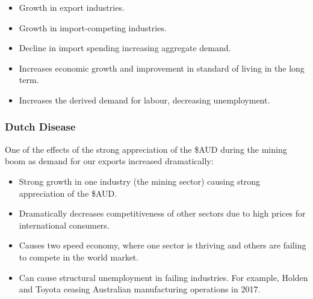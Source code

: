 \documentclass[a4paper,11pt]{article}
\begin{document}
\begin{itemize}
\item Growth in export industries.
\item Growth in import-competing industries.
\item Decline in import spending increasing aggregate demand.
\item Increases economic growth and improvement in standard of living in the
	long term.
\item Increases the derived demand for labour, decreasing unemployment.
\end{itemize}


\subsubsection{Dutch Disease}

One of the effects of the strong appreciation of the \$AUD during the mining
boom as demand for our exports increased dramatically:

\begin{itemize}
\item Strong growth in one industry (the mining sector) causing strong
	appreciation of the \$AUD.
\item Dramatically decreases competitiveness of other sectors due to high
	prices for international consumers.
\item Causes two speed economy, where one sector is thriving and others are
	failing to compete in the world market.
\item Can cause structural unemployment in failing industries. For example,
	Holden and Toyota ceasing Australian manufacturing operations in 2017.
\end{itemize}
\end{document}
